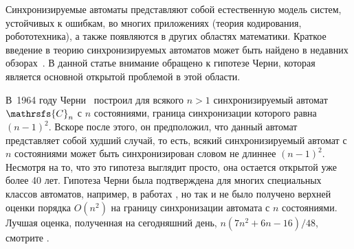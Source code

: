 \documentclass[11pt]{article}
\newcommand{\sa}{synchronizing automata}
\newcommand{\san}{synchronizing automaton}
\newcommand{\rl}{reset length}
\begin{document}
Синхронизируемые автоматы представляют собой естественную модель
систем, устойчивых к ошибкам, во многих приложениях (теория кодирования,
робототехника), а также появляются в других областях математики.
Краткое введение в теорию синхронизируемых автоматов может быть найдено
в недавних обзорах~\cite{Sa05,Vo08}. В данной статье внимание обращено к
гипотезе Черни, которая является основной открытой проблемой в этой области.





В~1964 году Черни~\cite{Ce64} построил для всякого $n>1$ синхронизируемый 
автомат $\mathrsfs{C}_n$ с $n$ состояниями, граница синхронизации которого равна $(n-1)^2$.
Вскоре после этого, он предположил, что данный автомат представляет собой худший случай,
то есть, всякий синхронизируемый автомат с $n$ состояниями может быть
синхронизирован словом не длиннее $(n-1)^2$. Несмотря на то, что это гипотеза
выглядит просто, она остается открытой уже более 40 лет. 
Гипотеза Черни была подтверждена для многих специальных классов
автоматов, например, в работах \cite{Ep90,Du98,Ka03,Tr07,Tr08,AS09,Vo09},
но так и не было получено верхней оценки порядка $O(n^2)$ на границу синхронизации автомата с $n$
состояниями. Лучшая оценка, полученная на сегодняшний день,
$n(7n^2 + 6n - 16)/48$, смотрите \cite{Tr11}.

\end{document}
